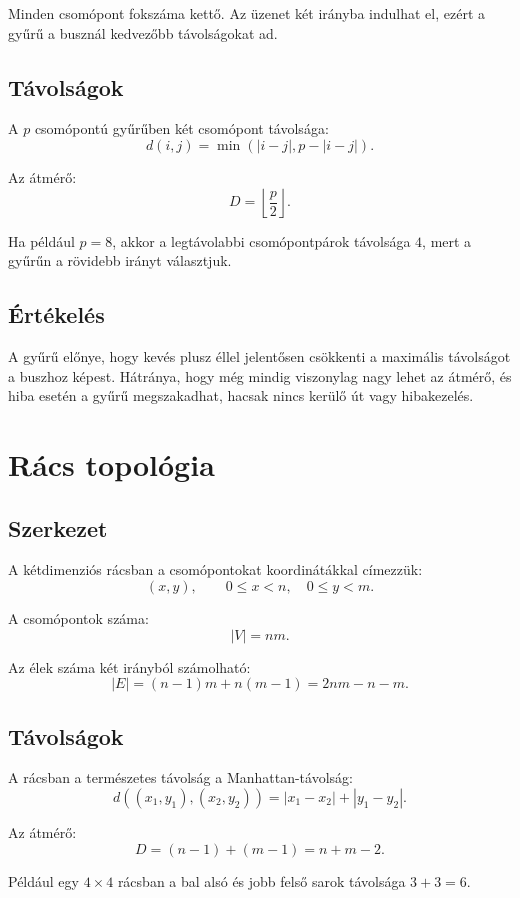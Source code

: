 Minden csomópont fokszáma kettő. Az üzenet két irányba indulhat el, ezért a gyűrű a busznál kedvezőbb távolságokat ad.

\subsection{Távolságok}

A $p$ csomópontú gyűrűben két csomópont távolsága:
\[
  d(i,j)=\min(|i-j|,p-|i-j|).
\]

Az átmérő:
\[
  D=\left\lfloor\frac{p}{2}\right\rfloor.
\]

Ha például $p=8$, akkor a legtávolabbi csomópontpárok távolsága $4$, mert a gyűrűn a rövidebb irányt választjuk.

\subsection{Értékelés}

A gyűrű előnye, hogy kevés plusz éllel jelentősen csökkenti a maximális távolságot a buszhoz képest. Hátránya, hogy még mindig viszonylag nagy lehet az átmérő, és hiba esetén a gyűrű megszakadhat, hacsak nincs kerülő út vagy hibakezelés.

\section{Rács topológia}

\subsection{Szerkezet}

A kétdimenziós rácsban a csomópontokat koordinátákkal címezzük:
\[
  (x,y),\qquad 0\leq x<n,
  \quad 0\leq y<m.
\]

A csomópontok száma:
\[
  |V|=nm.
\]

Az élek száma két irányból számolható:
\[
  |E|=(n-1)m+n(m-1)=2nm-n-m.
\]

\subsection{Távolságok}

A rácsban a természetes távolság a Manhattan-távolság:
\[
  d((x_1,y_1),(x_2,y_2))=|x_1-x_2|+|y_1-y_2|.
\]

Az átmérő:
\[
  D=(n-1)+(m-1)=n+m-2.
\]

Például egy $4\times 4$ rácsban a bal alsó és jobb felső sarok távolsága $3+3=6$.

